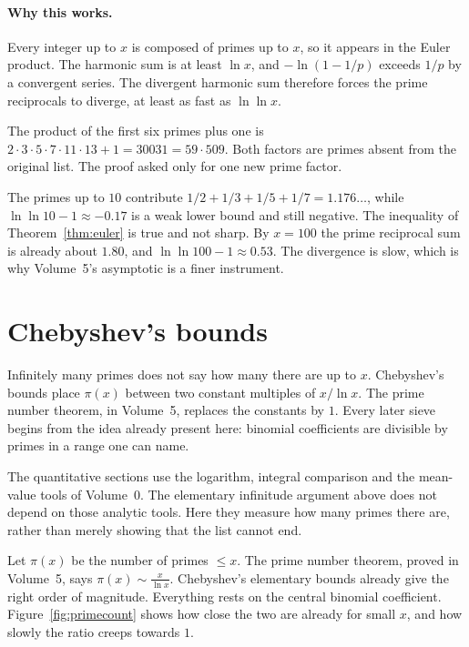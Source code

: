 \paragraph{Why this works.}
Every integer up to $x$ is composed of primes up to $x$, so it appears in the Euler product. The harmonic sum is at least $\ln x$, and $-\ln(1-1/p)$ exceeds $1/p$ by a convergent series. The divergent harmonic sum therefore forces the prime reciprocals to diverge, at least as fast as $\ln\ln x$.

\begin{examplex}
The product of the first six primes plus one is $2\cdot 3\cdot 5\cdot 7\cdot 11\cdot 13+1=30031=59\cdot 509$. Both factors are primes absent from the original list. The proof asked only for one new prime factor.
\end{examplex}

\begin{examplex}
The primes up to $10$ contribute $1/2+1/3+1/5+1/7=1.176\ldots$, while $\ln\ln 10-1\approx -0.17$ is a weak lower bound and still negative. The inequality of Theorem~\ref{thm:euler} is true and not sharp. By $x=100$ the prime reciprocal sum is already about $1.80$, and $\ln\ln 100-1\approx 0.53$. The divergence is slow, which is why Volume~5's asymptotic is a finer instrument.
\end{examplex}

\section{Chebyshev's bounds}

Infinitely many primes does not say how many there are up to $x$. Chebyshev's bounds place $\pi(x)$ between two constant multiples of $x/\ln x$. The prime number theorem, in Volume~5, replaces the constants by $1$. Every later sieve begins from the idea already present here: binomial coefficients are divisible by primes in a range one can name.

The quantitative sections use the logarithm, integral comparison and the
mean-value tools of Volume~0. The elementary infinitude argument above does
not depend on those analytic tools. Here they measure how many primes there
are, rather than merely showing that the list cannot end.


Let $\pi(x)$ be the number of primes $\le x$. The prime number theorem, proved in Volume~5, says $\pi(x)\sim\frac x{\ln x}$. Chebyshev's elementary bounds already give the right order of magnitude. Everything rests on the central binomial coefficient. Figure~\ref{fig:primecount} shows how close the two are already for small $x$, and how slowly the ratio creeps towards $1$.

